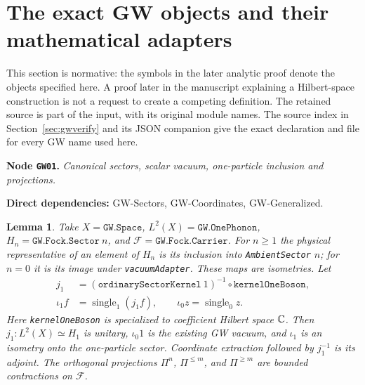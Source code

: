 \documentclass[11pt,a4paper]{article}
\newtheorem{lemma}[theorem]{Lemma}
\theoremstyle{remark}\newtheorem{remark}[theorem]{Remark}
\newcommand{\F}{\mathcal F}\newcommand{\Q}{\mathcal Q}\newcommand{\HH}{\mathcal H}
\newcommand{\node}[3]{\par\Needspace{6\baselineskip}\smallskip\hypertarget{node:#1}{}\label{nodepage:#1}\noindent\textbf{Node \texttt{#1}.} \textit{#2.}\par\noindent\textbf{Direct dependencies:} #3.\par}
\begin{document}
\section{The exact GW objects and their mathematical adapters}\label{sec:adapters}
This section is normative: the symbols in the later analytic proof denote the objects specified here. A proof later in the manuscript explaining a Hilbert-space construction is not a request to create a competing definition. The retained source is part of the input, with its original module names. The source index in Section~\ref{sec:gwverify} and its JSON companion give the exact declaration and file for every GW name used here.

\node{GW01}{Canonical sectors, scalar vacuum, one-particle inclusion and projections}{GW-Sectors, GW-Coordinates, GW-Generalized}
\begin{lemma}\label{lem:gwsectors}
Take $X=\texttt{GW.Space}$, $L^2(X)=\texttt{GW.OnePhonon}$, $H_n=\texttt{GW.Fock.Sector}\ n$, and $\F=\texttt{GW.Fock.Carrier}$. For $n\geq1$ the physical representative of an element of $H_n$ is its inclusion into \texttt{AmbientSector} $n$; for $n=0$ it is its image under \texttt{vacuumAdapter}. These maps are isometries. Let
\begin{align*}
 j_1&=(\texttt{ordinarySectorKernel}\ 1)^{-1}\circ
       \texttt{kernelOneBoson},\\
 \iota_1 f&=\operatorname{single}_1(j_1f),\qquad
 \iota_0 z=\operatorname{single}_0z.
\end{align*}
Here \texttt{kernelOneBoson} is specialized to coefficient Hilbert space $\mathbb C$. Then $j_1:L^2(X)\simeq H_1$ is unitary, $\iota_0 1$ is the existing GW vacuum, and $\iota_1$ is an isometry onto the one-particle sector. Coordinate extraction followed by $j_1^{-1}$ is its adjoint. The orthogonal projections $\Pi^n$, $\Pi^{\leq m}$, and $\Pi^{\geq m}$ are bounded contractions on $\F$.
\end{lemma}
\end{document}
